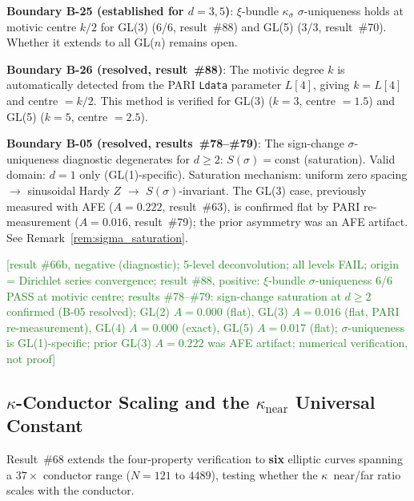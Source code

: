 \documentclass[11pt, a4paper]{article}
\theoremstyle{definition}
\theoremstyle{plain}
\begin{document}
\textbf{Boundary B-25 (established for $d{=}3,5$)}: $\xi$-bundle $\kappa_\sigma$
$\sigma$-uniqueness holds at motivic centre $k/2$ for GL(3) (6/6, result~\#88)
and GL(5) (3/3, result~\#70).  Whether it extends to all GL($n$) remains open.

\textbf{Boundary B-26 (resolved, result~\#88)}: The motivic degree $k$ is
automatically detected from the PARI \texttt{Ldata} parameter $L[4]$, giving
$k = L[4]$ and centre $= k/2$.  This method is verified for GL(3) ($k=3$,
centre $= 1.5$) and GL(5) ($k = 5$, centre $= 2.5$).

\textbf{Boundary B-05 (resolved, results~\#78--\#79)}: The sign-change $\sigma$-uniqueness diagnostic degenerates for $d \geq 2$: $S(\sigma) = \text{const}$ (saturation).  Valid domain: $d = 1$ only (GL(1)-specific).  Saturation mechanism: uniform zero spacing $\to$ sinusoidal Hardy $Z$ $\to$ $S(\sigma)$-invariant.  The GL(3) case, previously measured with AFE ($A = 0.222$, result~\#63), is confirmed flat by PARI re-measurement ($A = 0.016$, result~\#79); the prior asymmetry was an AFE artifact.  See Remark~\ref{rem:sigma_saturation}.

\textcolor{ForestGreen}{[result \#66b, negative (diagnostic); 5-level
deconvolution; all levels FAIL; origin = Dirichlet series convergence;
result \#88, positive: $\xi$-bundle $\sigma$-uniqueness 6/6 PASS at motivic centre;
results \#78--\#79: sign-change saturation at $d \geq 2$ confirmed (B-05 resolved);
GL(2) $A = 0.000$ (flat), GL(3) $A = 0.016$ (flat, PARI re-measurement),
GL(4) $A = 0.000$ (exact), GL(5) $A = 0.017$ (flat);
$\sigma$-uniqueness is GL(1)-specific; prior GL(3) $A = 0.222$ was AFE artifact;
numerical verification, not proof]}

\subsection{$\kappa$-Conductor Scaling and the $\kappa_{\mathrm{near}}$ Universal Constant}
\label{subsec:gl3_kappa_scaling}

Result~\#68 extends the four-property verification to \textbf{six} elliptic
curves spanning a $37\times$ conductor range ($N = 121$ to $4489$), testing
whether the $\kappa$~near/far ratio scales with the conductor.
\end{document}
